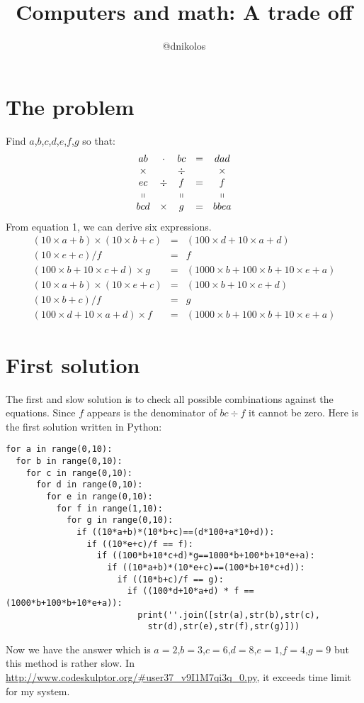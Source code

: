 \documentclass{article}
\begin{document}
\title{\vspace{-5em}Computers and math: A trade off}
\author{@dnikolos}
\date{}

\maketitle
\section{The problem}
Find $a$,$b$,$c$,$d$,$e$,$f$,$g$ so that:
\begin{equation}
\begin{array}{ccccc}
ab     &\cdot & bc &=&dad    \\
\times &      &\div& &\times   \\
ec     &\div  & f  &=&f        \\
\shortparallel      & & \shortparallel & & \shortparallel\\
bcd &\times & g &=& bbea
\end{array}
\end{equation}
From equation 1, we can derive six expressions.
\begin{equation}
\begin{array}{rcl}
(10\times a+b)\times (10\times b+c)&=&(100\times d+10\times a+d)\\
(10\times e+c)/f &=& f\\
(100\times b+10\times c+d)\times g&=& (1000\times b+100\times b+10\times e+a)\\
(10\times a+b)\times (10\times e+c)&=& (100\times b+10\times c+d)\\
(10\times b+c)/f &=& g\\
(100\times d+10\times a+d) \times  f &=& (1000\times b+100\times b+10\times e+a)
\end{array}
\end{equation}
\section{First solution}
The first and slow solution is to check all possible combinations against the equations.
Since $f$ appears is the denominator of $bc\div f$ it cannot be zero.
Here is the first solution written in Python:
\begin{lstlisting}
for a in range(0,10):
  for b in range(0,10):
    for c in range(0,10):
      for d in range(0,10):
        for e in range(0,10):
          for f in range(1,10):
            for g in range(0,10):
              if ((10*a+b)*(10*b+c)==(d*100+a*10+d)):
                if ((10*e+c)/f == f):
                  if ((100*b+10*c+d)*g==1000*b+100*b+10*e+a):
                    if ((10*a+b)*(10*e+c)==(100*b+10*c+d)):
                      if ((10*b+c)/f == g):
                        if ((100*d+10*a+d) * f == (1000*b+100*b+10*e+a)):
                          print(''.join([str(a),str(b),str(c),
                            str(d),str(e),str(f),str(g)]))
\end{lstlisting}
Now we have the answer which is $a=2$,$b=3$,$c=6$,$d=8$,$e=1$,$f=4$,$g=9$ but this method is rather slow. In \url{http://www.codeskulptor.org/#user37_v9I1M7qi3q_0.py}, it exceeds time limit for my system.
\end{document}
